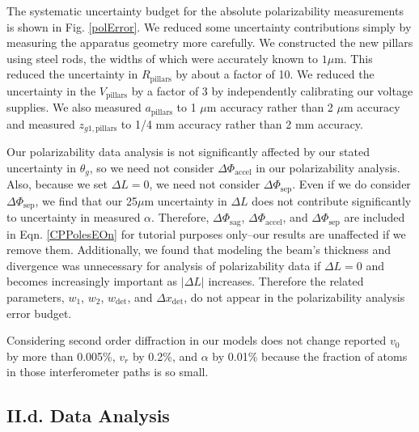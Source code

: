\documentclass[twocolumn,prl,showpacs,superscriptaddress]{revtex4-1}   %
\newcommand{\figref}[1]{Fig. \ref{#1}}
\newcommand{\eqnref}[1]{Eqn. \eqref{#1}}
\newcommand{\dphisep}{\Delta\Phi_{\mathrm{sep}}}
\newcommand{\dphisag}{\Delta\Phi_{\mathrm{sag}}}
\newcommand{\dphiaccel}{\Delta\Phi_{\mathrm{accel}}}
\begin{document}
The systematic uncertainty budget for the absolute polarizability measurements is shown in \figref{polError}. We reduced some uncertainty contributions simply by measuring the apparatus geometry more carefully.
We constructed the new pillars using steel rods, the widths of which were accurately known to $1 \mu \text{m}$. This reduced the uncertainty in $R_{\mathrm{pillars}}$ by about a factor of 10.
We reduced the uncertainty in the $V_{\mathrm{pillars}}$ by a factor of 3 by independently calibrating our voltage supplies. We also measured $a_{\mathrm{pillars}}$ to 1 $\mu$m accuracy rather than 2 $\mu$m accuracy and measured $z_{g1,\mathrm{pillars}}$ to 1/4 mm accuracy rather than 2 mm accuracy. 

Our polarizability data analysis is not significantly affected by our stated uncertainty in $\theta_g$, so we need not consider $\dphiaccel$ in our polarizability analysis.
Also, because we set $\Delta L = 0$, we need not consider $\dphisep$.
Even if we do consider $\dphisep$, we find that our 25$\mu$m uncertainty in $\Delta L$ does not contribute significantly to uncertainty in measured $\alpha$.
Therefore, $\dphisag$, $\dphiaccel$, and $\dphisep$ are included in \eqnref{CPPolesEOn} for tutorial purposes only--our results are unaffected if we remove them.
Additionally, we found that modeling the beam's thickness and divergence was unnecessary for analysis of polarizability data if $\Delta L = 0$ and becomes increasingly important as $|\Delta L|$ increases.
Therefore the related parameters, $w_1$, $w_2$, $w_{\mathrm{det}}$, and $\Delta x_{\mathrm{det}}$, do not appear in the polarizability analysis error budget.

Considering second order diffraction in our models does not change reported $v_0$ by more than 0.005\%, $v_r$ by 0.2\%, and $\alpha$ by 0.01\% because the fraction of atoms in those interferometer paths is so small. 

\subsection{II.d. Data Analysis}
\end{document}

